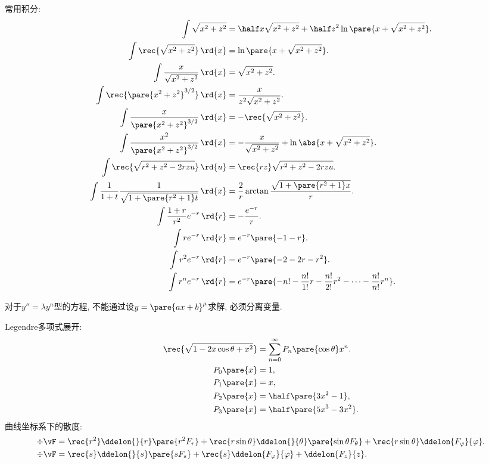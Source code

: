 \documentclass{ctexart}
\begin{document}
常用积分:
\begin{align*}
	\int \sqrt{x^2+z^2} &= \half x\sqrt{x^2+z^2} + \half z^2 \ln\pare{x+\sqrt{x^2+z^2}}. \\
	\int \rec{\sqrt{x^2+z^2}}\,\rd{x} &= \ln \pare{x+\sqrt{x^2+z^2}}.\\
	\int \frac{x}{\sqrt{x^2+z^2}}\,\rd{x} &= \sqrt{x^2+z^2}.\\
	\int \rec{\pare{x^2+z^2}^{3/2}}\,\rd{x} &= \frac{x}{z^2\sqrt{x^2+z^2}}.\\
	\int \frac{x}{\pare{x^2+z^2}^{3/2}}\,\rd{x} &= -\rec{\sqrt{x^2+z^2}}.\\
	\int \frac{x^2}{\pare{x^2+z^2}^{3/2}}\,\rd{x} &= -\frac{x}{\sqrt{x^2+z^2}} + \ln\abs{x+\sqrt{x^2+z^2}}.\\
	\int \rec{\sqrt{r^2+z^2-2rzu}}\,\rd{u} &= \rec{rz}\sqrt{r^2+z^2-2rzu}. \\
	\int \frac{1}{1+t}\frac{1}{\sqrt{1+\pare{r^2+1}t}}\,\rd{x} &= \frac{2}{r}\arctan\frac{\sqrt{1+\pare{r^2+1}x}}{r}.\\
	\int \frac{1+r}{r^2}e^{-r}\,\rd{r} &= -\frac{e^{-r}}{r}.\\
	\int re^{-r}\,\rd{r} &= e^{-r}\pare{-1-r}.\\
	\int r^2e^{-r}\,\rd{r} &= e^{-r}\pare{-2-2r-r^2}.\\
	\int r^n e^{-r}\,\rd{r} &= e^{-r}\pare{-n! - \frac{n!}{1!} r - \frac{n!}{2!} r^2 - \cdots - \frac{n!}{n!}r^n}.
\end{align*}
\begin{pitfall}
	对于$y''=\lambda y^n$型的方程, 不能通过设$y=\pare{a x + b}^{\mu}$求解, 必须分离变量.
\end{pitfall}
Legendre多项式展开:
\begin{align*}
	\rec{\sqrt{1-2x\cos\theta+x^2}} &= \sum_{n=0}^\infty P_n\pare{\cos\theta}x^n. \\
	P_0\pare{x} &= 1,\\
	P_1\pare{x} &= x,\\
	P_2\pare{x} &= \half\pare{3x^2-1},\\
	P_3\pare{x} &= \half\pare{5x^3-3x^2}.
\end{align*}
曲线坐标系下的散度:
\begin{align*}
	\div\vF &= \rec{r^2}\ddelon{}{r}\pare{r^2F_r} + \rec{r\sin\theta} \ddelon{}{\theta}\pare{\sin\theta F_\theta} + \rec{r\sin\theta} \ddelon{F_\varphi}{\varphi}.\\
	\div\vF &= \rec{s}\ddelon{}{s}\pare{s F_s} + \rec{s}\ddelon{F_\varphi}{\varphi} + \ddelon{F_z}{z}.
\end{align*}
\end{document}
